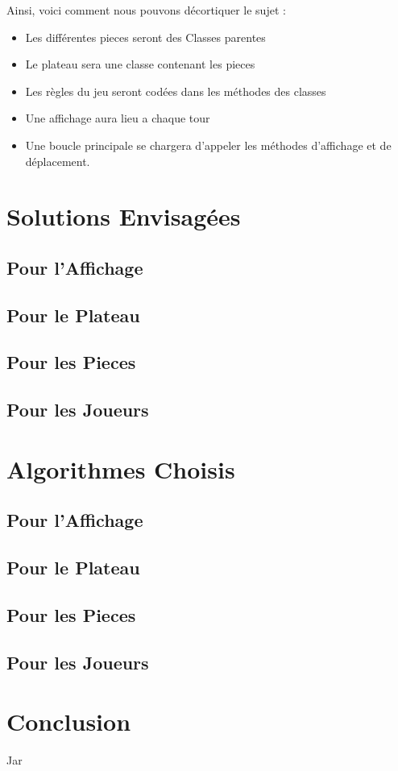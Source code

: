 \documentclass[titlepage]{report}
\begin{document}
\noindent Ainsi, voici comment nous pouvons décortiquer le sujet :\\
\begin{itemize}[label=$\bullet$] 
    \item Les différentes pieces seront des Classes parentes
    \item Le plateau sera une classe contenant les pieces
    \item Les règles du jeu seront codées dans les méthodes des classes
    \item Une affichage aura lieu a chaque tour
    \item Une boucle principale se chargera d'appeler les méthodes d'affichage et de déplacement.
\end{itemize}

\section{Solutions Envisagées}

\subsection{Pour l’Affichage}
\subsection{Pour le Plateau}
\subsection{Pour les Pieces}
\subsection{Pour les Joueurs}

\section{Algorithmes Choisis}

\subsection{Pour l’Affichage}
\subsection{Pour le Plateau}
\subsection{Pour les Pieces}
\subsection{Pour les Joueurs}

\section{Conclusion}
Jar
\end{document}
